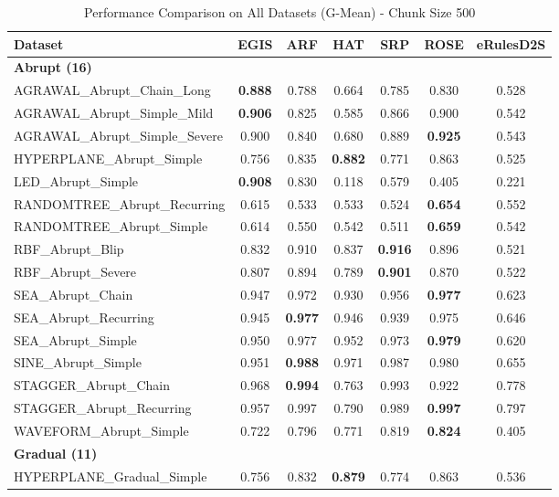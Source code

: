 \begin{table}[ht]
\centering
\caption{Performance Comparison on All Datasets (G-Mean) - Chunk Size 500}
\label{tab:full_comparison}
\footnotesize
\begin{tabular}{l|cccccc}
\toprule
\textbf{Dataset} & \textbf{EGIS} & \textbf{ARF} & \textbf{HAT} & \textbf{SRP} & \textbf{ROSE} & \textbf{eRulesD2S} \\
\midrule
\multicolumn{7}{l}{\textbf{Abrupt (16)}} \\
AGRAWAL\_Abrupt\_Chain\_Long & \textbf{0.888} & 0.788 & 0.664 & 0.785 & 0.830 & 0.528 \\
AGRAWAL\_Abrupt\_Simple\_Mild & \textbf{0.906} & 0.825 & 0.585 & 0.866 & 0.900 & 0.542 \\
AGRAWAL\_Abrupt\_Simple\_Severe & 0.900 & 0.840 & 0.680 & 0.889 & \textbf{0.925} & 0.543 \\
HYPERPLANE\_Abrupt\_Simple & 0.756 & 0.835 & \textbf{0.882} & 0.771 & 0.863 & 0.525 \\
LED\_Abrupt\_Simple & \textbf{0.908} & 0.830 & 0.118 & 0.579 & 0.405 & 0.221 \\
RANDOMTREE\_Abrupt\_Recurring & 0.615 & 0.533 & 0.533 & 0.524 & \textbf{0.654} & 0.552 \\
RANDOMTREE\_Abrupt\_Simple & 0.614 & 0.550 & 0.542 & 0.511 & \textbf{0.659} & 0.542 \\
RBF\_Abrupt\_Blip & 0.832 & 0.910 & 0.837 & \textbf{0.916} & 0.896 & 0.521 \\
RBF\_Abrupt\_Severe & 0.807 & 0.894 & 0.789 & \textbf{0.901} & 0.870 & 0.522 \\
SEA\_Abrupt\_Chain & 0.947 & 0.972 & 0.930 & 0.956 & \textbf{0.977} & 0.623 \\
SEA\_Abrupt\_Recurring & 0.945 & \textbf{0.977} & 0.946 & 0.939 & 0.975 & 0.646 \\
SEA\_Abrupt\_Simple & 0.950 & 0.977 & 0.952 & 0.973 & \textbf{0.979} & 0.620 \\
SINE\_Abrupt\_Simple & 0.951 & \textbf{0.988} & 0.971 & 0.987 & 0.980 & 0.655 \\
STAGGER\_Abrupt\_Chain & 0.968 & \textbf{0.994} & 0.763 & 0.993 & 0.922 & 0.778 \\
STAGGER\_Abrupt\_Recurring & 0.957 & 0.997 & 0.790 & 0.989 & \textbf{0.997} & 0.797 \\
WAVEFORM\_Abrupt\_Simple & 0.722 & 0.796 & 0.771 & 0.819 & \textbf{0.824} & 0.405 \\
\multicolumn{7}{l}{\textbf{Gradual (11)}} \\
HYPERPLANE\_Gradual\_Simple & 0.756 & 0.832 & \textbf{0.879} & 0.774 & 0.863 & 0.536 \\

\end{tabular}
\end{table}
